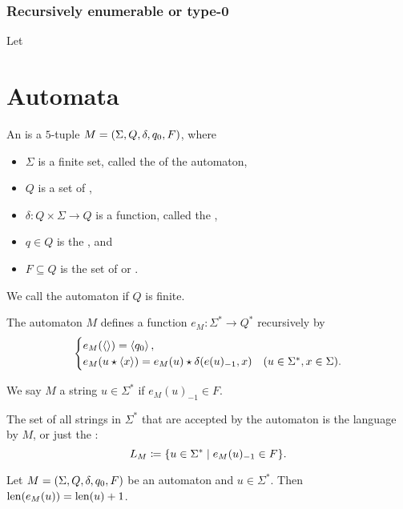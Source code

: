 \subsubsection{Recursively enumerable or type-0}

\begin{example}
Let
\end{example}

\section{Automata}
\begin{definition}
An  is a $5$-tuple $M = \sSet{\Sigma, Q, \delta, q_0, F}$, where
\begin{itemize}
\item $\Sigma$ is a finite set, called the  of the automaton,
\item $Q$ is a set of ,
\item $\delta: Q\times \Sigma\to Q$ is a function, called the ,
\item $q\in Q$ is the , and
\item $F\subseteq Q$ is the set of  or .
\end{itemize}
We call the automaton  if $Q$ is finite.

The automaton $M$ defines a function $e_M: \Sigma^* \to Q^*$ recursively by
\[ \begin{cases}
e_M(\left\langle  \right\rangle) = \left\langle q_0 \right\rangle, \\
e_M(u\star \left\langle x \right\rangle) = e_M(u)\star \delta(e(u)_{-1}, x) & (u\in \Sigma^*, x\in \Sigma).
\end{cases} \]

We say $M$  a string $u\in \Sigma^*$ if $e_M(u)_{-1} \in F$.

The set of all strings in $\Sigma^*$ that are accepted by the automaton is the language  by $M$, or just the :
\[ L_M \defeq \setbuilder{u\in\Sigma^*}{e_M(u)_{-1} \in F}. \]
\end{definition}

\begin{lemma} \label{automatonExecutionLength}
Let $M = \sSet{\Sigma, Q, \delta, q_0, F}$ be an automaton and $u\in \Sigma^*$. Then $\operatorname{len}(e_M(u)) = \operatorname{len}(u)+1$.
\end{lemma}

